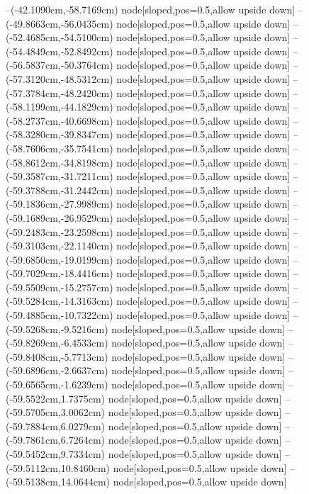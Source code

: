 --(-42.1090cm,-58.7169cm) node[sloped,pos=0.5,allow upside down]{\ArrowIn}
--(-49.8663cm,-56.0435cm) node[sloped,pos=0.5,allow upside down]{\ArrowIn}
--(-52.4685cm,-54.5100cm) node[sloped,pos=0.5,allow upside down]{\ArrowIn}
--(-54.4849cm,-52.8492cm) node[sloped,pos=0.5,allow upside down]{\ArrowIn}
--(-56.5837cm,-50.3764cm) node[sloped,pos=0.5,allow upside down]{\ArrowIn}
--(-57.3120cm,-48.5312cm) node[sloped,pos=0.5,allow upside down]{\ArrowIn}
--(-57.3784cm,-48.2420cm) node[sloped,pos=0.5,allow upside down]{\arrowIn}
--(-58.1199cm,-44.1829cm) node[sloped,pos=0.5,allow upside down]{\ArrowIn}
--(-58.2737cm,-40.6698cm) node[sloped,pos=0.5,allow upside down]{\ArrowIn}
--(-58.3280cm,-39.8347cm) node[sloped,pos=0.5,allow upside down]{\arrowIn}
--(-58.7606cm,-35.7541cm) node[sloped,pos=0.5,allow upside down]{\ArrowIn}
--(-58.8612cm,-34.8198cm) node[sloped,pos=0.5,allow upside down]{\arrowIn}
--(-59.3587cm,-31.7211cm) node[sloped,pos=0.5,allow upside down]{\ArrowIn}
--(-59.3788cm,-31.2442cm) node[sloped,pos=0.5,allow upside down]{\arrowIn}
--(-59.1836cm,-27.9989cm) node[sloped,pos=0.5,allow upside down]{\ArrowIn}
--(-59.1689cm,-26.9529cm) node[sloped,pos=0.5,allow upside down]{\ArrowIn}
--(-59.2483cm,-23.2598cm) node[sloped,pos=0.5,allow upside down]{\ArrowIn}
--(-59.3103cm,-22.1140cm) node[sloped,pos=0.5,allow upside down]{\ArrowIn}
--(-59.6850cm,-19.0199cm) node[sloped,pos=0.5,allow upside down]{\ArrowIn}
--(-59.7029cm,-18.4416cm) node[sloped,pos=0.5,allow upside down]{\arrowIn}
--(-59.5509cm,-15.2757cm) node[sloped,pos=0.5,allow upside down]{\ArrowIn}
--(-59.5284cm,-14.3163cm) node[sloped,pos=0.5,allow upside down]{\arrowIn}
--(-59.4885cm,-10.7322cm) node[sloped,pos=0.5,allow upside down]{\ArrowIn}
--(-59.5268cm,-9.5216cm) node[sloped,pos=0.5,allow upside down]{\ArrowIn}
--(-59.8269cm,-6.4533cm) node[sloped,pos=0.5,allow upside down]{\ArrowIn}
--(-59.8408cm,-5.7713cm) node[sloped,pos=0.5,allow upside down]{\arrowIn}
--(-59.6896cm,-2.6637cm) node[sloped,pos=0.5,allow upside down]{\ArrowIn}
--(-59.6565cm,-1.6239cm) node[sloped,pos=0.5,allow upside down]{\ArrowIn}
--(-59.5522cm,1.7375cm) node[sloped,pos=0.5,allow upside down]{\ArrowIn}
--(-59.5705cm,3.0062cm) node[sloped,pos=0.5,allow upside down]{\ArrowIn}
--(-59.7884cm,6.0279cm) node[sloped,pos=0.5,allow upside down]{\ArrowIn}
--(-59.7861cm,6.7264cm) node[sloped,pos=0.5,allow upside down]{\arrowIn}
--(-59.5452cm,9.7334cm) node[sloped,pos=0.5,allow upside down]{\ArrowIn}
--(-59.5112cm,10.8460cm) node[sloped,pos=0.5,allow upside down]{\ArrowIn}
--(-59.5138cm,14.0644cm) node[sloped,pos=0.5,allow upside down]{\ArrowIn}

